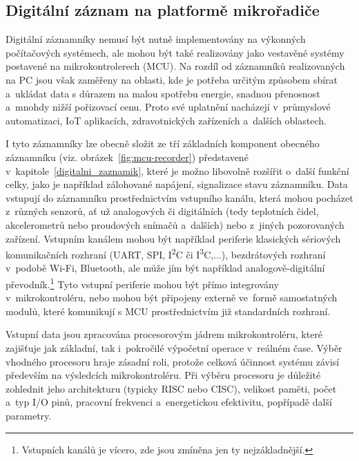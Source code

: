 \subsection{Digitální záznam na platformě mikrořadiče}
\label{digitalni_zaznamnik_mikroradic}
Digitální záznamníky nemusí být nutně implementovány na výkonných počítačových systémech, ale mohou být také realizovány jako vestavěné systémy postavené na mikrokontrolerech (MCU). Na rozdíl od záznamníků realizovaných na PC jsou však zaměřeny na oblasti, kde je potřeba určitým způsobem sbírat a~ukládat data s důrazem na malou spotřebu energie, snadnou přenosnost a~mnohdy nižší pořizovací cenu. Proto své uplatnění nacházejí v~průmyslové automatizaci, IoT aplikacích, zdravotnických zařízeních a~dalších oblastech.~\cite{iot_datalogger_with_timestamping, researchgate_general_dataloggger_multiple_sdcards}

I tyto záznamníky lze obecně složit ze tří základních komponent obecného záznamníku (viz. obrázek~\ref{fig:mcu-recorder}) představené v~kapitole~\ref{digitalni_zaznamik}, které je možno libovolně rozšířit o~další funkční celky, jako je například zálohované napájení, signalizace stavu záznamníku. Data vstupují do záznamníku prostřednictvím vstupního kanálu, která mohou pocházet z~různých senzorů, ať už analogových či digitálních (tedy teplotních čidel, akcelerometrů nebo proudových snímačů a~dalších) nebo z~jiných pozorovaných zařízení. Vstupním kanálem mohou být například periferie klasických sériových komunikačních rozhraní (UART, SPI, I\textsuperscript{2}C či I\textsuperscript{3}C,...), bezdrátových rozhraní v~podobě Wi-Fi, Bluetooth, ale může jím být například analogově-digitální převodník.\footnote{Vstupních kanálů je vícero, zde jsou zmíněna jen ty nejzákladnější.} Tyto vstupní periferie mohou být přímo integrovány v~mikrokontroléru, nebo mohou být připojeny externě ve~formě samostatných modulů, které komunikují s MCU prostřednictvím již standardních rozhraní.~\cite{ieee_digital_sound_recorder_arm_sd_card}

Vstupní data jsou zpracována procesorovým jádrem mikrokontroléru, které zajišťuje jak základní, tak i~pokročilé výpočetní operace v~reálném čase. Výběr vhodného procesoru hraje zásadní roli, protože celková účinnost systému závisí především na výsledcích mikrokontroléru. Při výběru procesoru je důležité zohlednit jeho architekturu (typicky RISC nebo CISC), velikost paměti, počet a~typ I/O pinů, pracovní frekvenci a~energetickou efektivitu, popřípadě další parametry.~\cite{smart_datalogger_data_acquisition_cpu, ieee_digital_sound_recorder_arm_sd_card}


